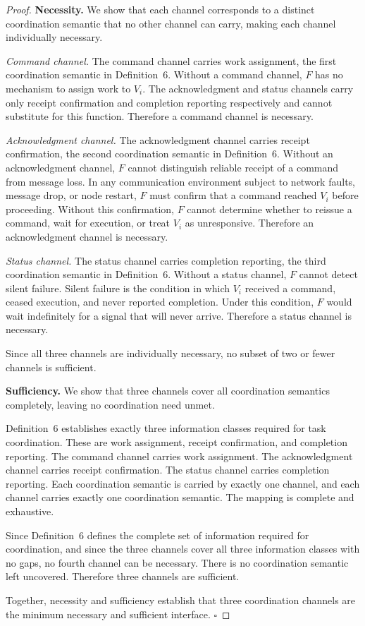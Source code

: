 \documentclass[a4paper,fleqn]{cas-dc}
\begin{document}
\begin{proof}
\textbf{Necessity.} We show that each channel corresponds to a distinct coordination semantic that no other channel can carry, making each channel individually necessary.

\textit{Command channel.} The command channel carries work assignment, the first coordination semantic in Definition~6. Without a command channel, $F$ has no mechanism to assign work to $V_i$. The acknowledgment and status channels carry only receipt confirmation and completion reporting respectively and cannot substitute for this function. Therefore a command channel is necessary.

\textit{Acknowledgment channel.} The acknowledgment channel carries receipt confirmation, the second coordination semantic in Definition~6. Without an acknowledgment channel, $F$ cannot distinguish reliable receipt of a command from message loss. In any communication environment subject to network faults, message drop, or node restart, $F$ must confirm that a command reached $V_i$ before proceeding. Without this confirmation, $F$ cannot determine whether to reissue a command, wait for execution, or treat $V_i$ as unresponsive. Therefore an acknowledgment channel is necessary.

\textit{Status channel.} The status channel carries completion reporting, the third coordination semantic in Definition~6. Without a status channel, $F$ cannot detect silent failure. Silent failure is the condition in which $V_i$ received a command, ceased execution, and never reported completion. Under this condition, $F$ would wait indefinitely for a signal that will never arrive. Therefore a status channel is necessary.

Since all three channels are individually necessary, no subset of two or fewer channels is sufficient.

\textbf{Sufficiency.} We show that three channels cover all coordination semantics completely, leaving no coordination need unmet.

Definition~6 establishes exactly three information classes required for task coordination. These are work assignment, receipt confirmation, and completion reporting. The command channel carries work assignment. The acknowledgment channel carries receipt confirmation. The status channel carries completion reporting. Each coordination semantic is carried by exactly one channel, and each channel carries exactly one coordination semantic. The mapping is complete and exhaustive.

Since Definition~6 defines the complete set of information required for coordination, and since the three channels cover all three information classes with no gaps, no fourth channel can be necessary. There is no coordination semantic left uncovered. Therefore three channels are sufficient.

Together, necessity and sufficiency establish that three coordination channels are the minimum necessary and sufficient interface. \hfill$\square$
\end{proof}
\end{document}
